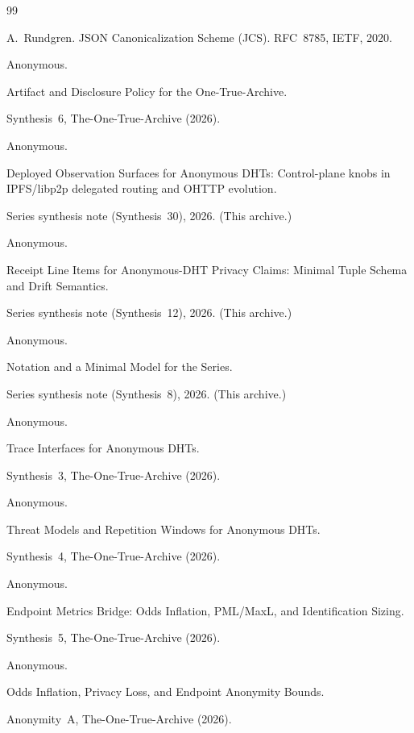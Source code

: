 \documentclass[11pt]{article}
\begin{document}
\begin{thebibliography}{99}\small


A.~Rundgren.
\newblock JSON Canonicalization Scheme (JCS).
\newblock RFC~8785, IETF, 2020.

Anonymous.

\newblock Artifact and Disclosure Policy for the One-True-Archive.

\newblock Synthesis~6, The-One-True-Archive (2026).

Anonymous.

\newblock Deployed Observation Surfaces for Anonymous DHTs: Control-plane knobs in IPFS/libp2p delegated routing and OHTTP evolution.

\newblock Series synthesis note (Synthesis~30), 2026. (This archive.)

Anonymous.

\newblock Receipt Line Items for Anonymous-DHT Privacy Claims: Minimal Tuple Schema and Drift Semantics.

\newblock Series synthesis note (Synthesis~12), 2026. (This archive.)

Anonymous.

\newblock Notation and a Minimal Model for the Series.

\newblock Series synthesis note (Synthesis~8), 2026. (This archive.)

Anonymous.

\newblock Trace Interfaces for Anonymous DHTs.

\newblock Synthesis~3, The-One-True-Archive (2026).

Anonymous.

\newblock Threat Models and Repetition Windows for Anonymous DHTs.

\newblock Synthesis~4, The-One-True-Archive (2026).

Anonymous.

\newblock Endpoint Metrics Bridge: Odds Inflation, PML/MaxL, and Identification Sizing.

\newblock Synthesis~5, The-One-True-Archive (2026).

Anonymous.

\newblock Odds Inflation, Privacy Loss, and Endpoint Anonymity Bounds.

\newblock Anonymity~A, The-One-True-Archive (2026).


\end{thebibliography}
\end{document}
